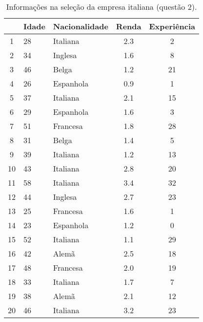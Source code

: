 \documentclass[a4paper,11pt]{article}
\begin{document}
\begin{table}[H]
    \centering
    \label{tab_2}
    \begin{tabular}{c l l c c}
        \toprule
        & \textbf{Idade} & \textbf{Nacionalidade} & \textbf{Renda} & \textbf{Experiência} \\
        \midrule
        1 & 28 & Italiana & 2.3 & 2 \\
        2 & 34 & Inglesa & 1.6 & 8 \\
        3 & 46 & Belga & 1.2 & 21 \\
        4 & 26 & Espanhola & 0.9 & 1 \\
        5 & 37 & Italiana & 2.1 & 15 \\
        6 & 29 & Espanhola & 1.6 & 3 \\
        7 & 51 & Francesa & 1.8 & 28 \\
        8 & 31 & Belga & 1.4 & 5 \\
        9 & 39 & Italiana & 1.2 & 13 \\
        10 & 43 & Italiana & 2.8 & 20 \\
        11 & 58 & Italiana & 3.4 & 32 \\
        12 & 44 & Inglesa & 2.7 & 23 \\
        13 & 25 & Francesa & 1.6 & 1 \\
        14 & 23 & Espanhola & 1.2 & 0 \\
        15 & 52 & Italiana & 1.1 & 29 \\
        16 & 42 & Alemã & 2.5 & 18 \\
        17 & 48 & Francesa & 2.0 & 19 \\
        18 & 33 & Italiana & 1.7 & 7 \\
        19 & 38 & Alemã & 2.1 & 12 \\
        20 & 46 & Italiana & 3.2 & 23 \\
        \bottomrule
    \end{tabular}
        \caption{Informações na seleção da empresa italiana (questão 2).}
\end{table}
\end{document}
